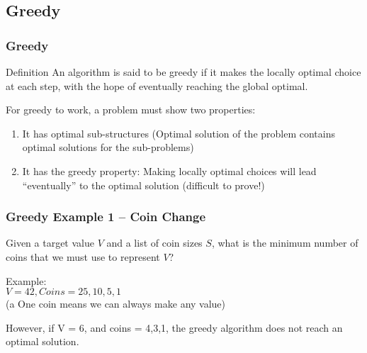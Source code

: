 \documentclass{beamer}
\begin{document}
\subsection{Greedy}
\begin{frame}
  \frametitle{Greedy}

  \begin{block}{Definition}
    An algorithm is said to be greedy if it makes the locally optimal
    choice at each step, with the hope of eventually reaching the
    global optimal.
  \end{block}

  \vfill

  For greedy to work, a problem must show two properties:
  \begin{enumerate}
  \item It has optimal sub-structures (Optimal solution of the problem
    contains optimal solutions for the sub-problems)
  \item It has the greedy property: Making locally optimal choices
    will lead ``eventually'' to the optimal solution (difficult to
    prove!)
  \end{enumerate}

\end{frame}

\begin{frame}
  \frametitle{Greedy Example 1 -- Coin Change}

  Given a target value $V$ and a list of coin sizes $S$, what is the
  minimum number of coins that we must use to represent $V$?

  \bigskip

  Example:\\ 
  $V = 42, Coins = 25, 10, 5, 1$\\
  (a One coin means we can always make any value)

  \bigskip

  However, if V = 6, and coins = 4,3,1, the greedy algorithm does not
  reach an optimal solution.
\end{frame}
\end{document}
